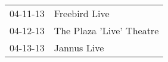 \begin{supertabular}{p{0.07\textwidth}p{0.23\textwidth}}
 04-11-13 &             Freebird Live \\
 04-12-13 &  The Plaza 'Live' Theatre \\
 04-13-13 &               Jannus Live \\
\end{supertabular}
